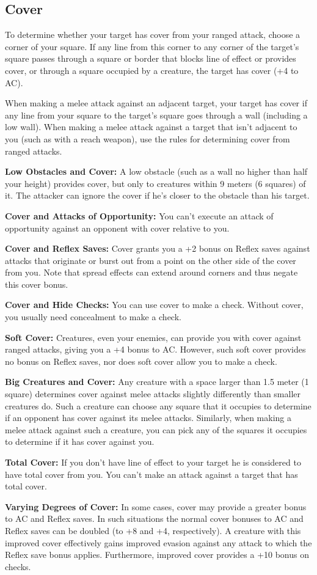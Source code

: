\subsection{Cover}
To determine whether your target has cover from your ranged attack, choose a corner of your square. If any line from this corner to any corner of the target's square passes through a square or border that blocks line of effect or provides cover, or through a square occupied by a creature, the target has cover (+4 to AC).

When making a melee attack against an adjacent target, your target has cover if any line from your square to the target's square goes through a wall (including a low wall). When making a melee attack against a target that isn't adjacent to you (such as with a reach weapon), use the rules for determining cover from ranged attacks.

\textbf{Low Obstacles and Cover:} A low obstacle (such as a wall no higher than half your height) provides cover, but only to creatures within 9 meters (6 squares) of it. The attacker can ignore the cover if he's closer to the obstacle than his target.

\textbf{Cover and Attacks of Opportunity:} You can't execute an attack of opportunity against an opponent with cover relative to you.

\textbf{Cover and Reflex Saves:} Cover grants you a +2 bonus on Reflex saves against attacks that originate or burst out from a point on the other side of the cover from you. Note that spread effects can extend around corners and thus negate this cover bonus.

\textbf{Cover and Hide Checks:} You can use cover to make a  check. Without cover, you usually need concealment to make a  check.

\textbf{Soft Cover:} Creatures, even your enemies, can provide you with cover against ranged attacks, giving you a +4 bonus to AC. However, such soft cover provides no bonus on Reflex saves, nor does soft cover allow you to make a  check.

\textbf{Big Creatures and Cover:} Any creature with a space larger than 1.5 meter (1 square) determines cover against melee attacks slightly differently than smaller creatures do. Such a creature can choose any square that it occupies to determine if an opponent has cover against its melee attacks. Similarly, when making a melee attack against such a creature, you can pick any of the squares it occupies to determine if it has cover against you.

\textbf{Total Cover:} If you don't have line of effect to your target he is considered to have total cover from you. You can't make an attack against a target that has total cover.

\textbf{Varying Degrees of Cover:} In some cases, cover may provide a greater bonus to AC and Reflex saves. In such situations the normal cover bonuses to AC and Reflex saves can be doubled (to +8 and +4, respectively). A creature with this improved cover effectively gains improved evasion against any attack to which the Reflex save bonus applies. Furthermore, improved cover provides a +10 bonus on  checks.